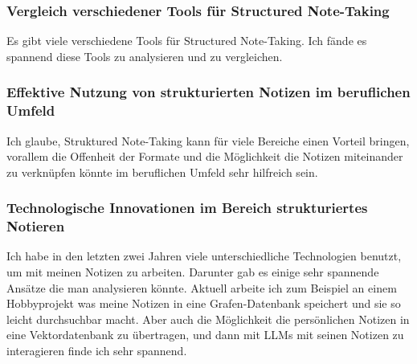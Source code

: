 \documentclass{article}
\begin{document}
\subsubsection{Vergleich verschiedener Tools für Structured Note-Taking}
Es gibt viele verschiedene Tools für Structured Note-Taking. Ich fände es spannend diese Tools zu analysieren und zu vergleichen. 

\subsubsection{Effektive Nutzung von strukturierten Notizen im beruflichen Umfeld}
Ich glaube, Struktured Note-Taking kann für viele Bereiche einen Vorteil bringen, vorallem die Offenheit der Formate und die Möglichkeit die Notizen miteinander zu verknüpfen könnte im beruflichen Umfeld sehr hilfreich sein.

\subsubsection{Technologische Innovationen im Bereich strukturiertes Notieren}
Ich habe in den letzten zwei Jahren viele unterschiedliche Technologien benutzt, um mit meinen Notizen zu arbeiten. Darunter gab es einige sehr spannende Ansätze die man analysieren könnte.
\linebreak
Aktuell arbeite ich zum Beispiel an einem Hobbyprojekt was meine Notizen in eine Grafen-Datenbank speichert und sie so leicht durchsuchbar macht.
\linebreak
\linebreak
Aber auch die Möglichkeit die persönlichen Notizen in eine Vektordatenbank zu übertragen, und dann mit LLMs mit seinen Notizen zu interagieren finde ich sehr spannend.
\end{document}
